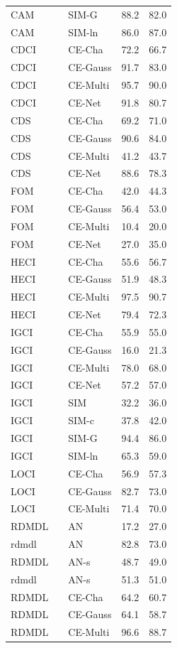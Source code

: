 \begin{tabular}{lllll}
CAM &  & SIM-G & 88.2 & 82.0 \\
CAM &  & SIM-ln & 86.0 & 87.0 \\
CDCI &  & CE-Cha & 72.2 & 66.7 \\
CDCI &  & CE-Gauss & 91.7 & 83.0 \\
CDCI &  & CE-Multi & 95.7 & 90.0 \\
CDCI &  & CE-Net & 91.8 & 80.7 \\
CDS &  & CE-Cha & 69.2 & 71.0 \\
CDS &  & CE-Gauss & 90.6 & 84.0 \\
CDS &  & CE-Multi & 41.2 & 43.7 \\
CDS &  & CE-Net & 88.6 & 78.3 \\
FOM &  & CE-Cha & 42.0 & 44.3 \\
FOM &  & CE-Gauss & 56.4 & 53.0 \\
FOM &  & CE-Multi & 10.4 & 20.0 \\
FOM &  & CE-Net & 27.0 & 35.0 \\
HECI &  & CE-Cha & 55.6 & 56.7 \\
HECI &  & CE-Gauss & 51.9 & 48.3 \\
HECI &  & CE-Multi & 97.5 & 90.7 \\
HECI &  & CE-Net & 79.4 & 72.3 \\
IGCI &  & CE-Cha & 55.9 & 55.0 \\
IGCI &  & CE-Gauss & 16.0 & 21.3 \\
IGCI &  & CE-Multi & 78.0 & 68.0 \\
IGCI &  & CE-Net & 57.2 & 57.0 \\
IGCI &  & SIM & 32.2 & 36.0 \\
IGCI &  & SIM-c & 37.8 & 42.0 \\
IGCI &  & SIM-G & 94.4 & 86.0 \\
IGCI &  & SIM-ln & 65.3 & 59.0 \\
LOCI &  & CE-Cha & 56.9 & 57.3 \\
LOCI &  & CE-Gauss & 82.7 & 73.0 \\
LOCI &  & CE-Multi & 71.4 & 70.0 \\
RDMDL &  & AN & 17.2 & 27.0 \\
rdmdl &  & AN & 82.8 & 73.0 \\
RDMDL &  & AN-s & 48.7 & 49.0 \\
rdmdl &  & AN-s & 51.3 & 51.0 \\
RDMDL &  & CE-Cha & 64.2 & 60.7 \\
RDMDL &  & CE-Gauss & 64.1 & 58.7 \\
RDMDL &  & CE-Multi & 96.6 & 88.7 \\

\end{tabular}
